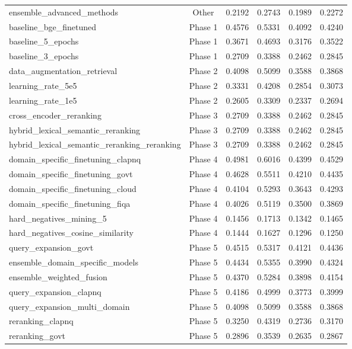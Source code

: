\documentclass[11pt]{article}
\begin{document}
\begin{longtable}{lccccc}
ensemble\_advanced\_methods & Other & 0.2192 & 0.2743 & 0.1989 & 0.2272 \\
baseline\_bge\_finetuned & Phase 1 & 0.4576 & 0.5331 & 0.4092 & 0.4240 \\
baseline\_5\_epochs & Phase 1 & 0.3671 & 0.4693 & 0.3176 & 0.3522 \\
baseline\_3\_epochs & Phase 1 & 0.2709 & 0.3388 & 0.2462 & 0.2845 \\
data\_augmentation\_retrieval & Phase 2 & 0.4098 & 0.5099 & 0.3588 & 0.3868 \\
learning\_rate\_5e5 & Phase 2 & 0.3331 & 0.4208 & 0.2854 & 0.3073 \\
learning\_rate\_1e5 & Phase 2 & 0.2605 & 0.3309 & 0.2337 & 0.2694 \\
cross\_encoder\_reranking & Phase 3 & 0.2709 & 0.3388 & 0.2462 & 0.2845 \\
hybrid\_lexical\_semantic\_reranking & Phase 3 & 0.2709 & 0.3388 & 0.2462 & 0.2845 \\
hybrid\_lexical\_semantic\_reranking\_reranking & Phase 3 & 0.2709 & 0.3388 & 0.2462 & 0.2845 \\
domain\_specific\_finetuning\_clapnq & Phase 4 & 0.4981 & 0.6016 & 0.4399 & 0.4529 \\
domain\_specific\_finetuning\_govt & Phase 4 & 0.4628 & 0.5511 & 0.4210 & 0.4435 \\
domain\_specific\_finetuning\_cloud & Phase 4 & 0.4104 & 0.5293 & 0.3643 & 0.4293 \\
domain\_specific\_finetuning\_fiqa & Phase 4 & 0.4026 & 0.5119 & 0.3500 & 0.3869 \\
hard\_negatives\_mining\_5 & Phase 4 & 0.1456 & 0.1713 & 0.1342 & 0.1465 \\
hard\_negatives\_cosine\_similarity & Phase 4 & 0.1444 & 0.1627 & 0.1296 & 0.1250 \\
query\_expansion\_govt & Phase 5 & 0.4515 & 0.5317 & 0.4121 & 0.4436 \\
ensemble\_domain\_specific\_models & Phase 5 & 0.4434 & 0.5355 & 0.3990 & 0.4324 \\
ensemble\_weighted\_fusion & Phase 5 & 0.4370 & 0.5284 & 0.3898 & 0.4154 \\
query\_expansion\_clapnq & Phase 5 & 0.4186 & 0.4999 & 0.3773 & 0.3999 \\
query\_expansion\_multi\_domain & Phase 5 & 0.4098 & 0.5099 & 0.3588 & 0.3868 \\
reranking\_clapnq & Phase 5 & 0.3250 & 0.4319 & 0.2736 & 0.3170 \\
reranking\_govt & Phase 5 & 0.2896 & 0.3539 & 0.2635 & 0.2867 \\

\end{longtable}
\end{document}
